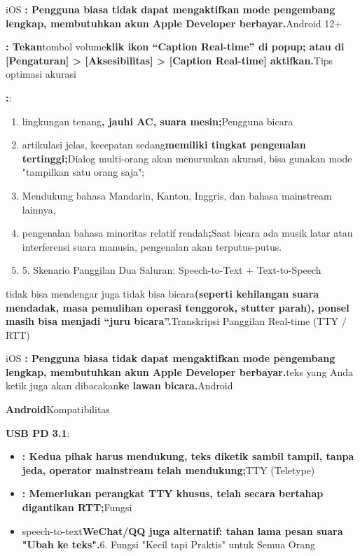 \begin{tcbinfo}{iOS}
\textbf{: Pengguna biasa tidak dapat mengaktifkan mode pengembang lengkap, membutuhkan akun Apple Developer berbayar.}Android 12+

\textbf{: Tekan}tombol volume\textbf{klik ikon “Caption Real-time” di popup; atau di [Pengaturan] > [Aksesibilitas] > [Caption Real-time] aktifkan.}Tips optimasi akurasi

\textbf{:}:

\begin{enumerate}
  \item lingkungan tenang\textbf{, jauhi AC, suara mesin;}Pengguna bicara
  \item artikulasi jelas, kecepatan sedang\textbf{memiliki tingkat pengenalan tertinggi;}Dialog multi-orang akan menurunkan akurasi, bisa gunakan mode "tampilkan satu orang saja";
  \item Mendukung bahasa Mandarin, Kanton, Inggris, dan bahasa mainstream lainnya,
  \item pengenalan bahasa minoritas relatif rendah\textbf{;}Saat bicara ada musik latar atau interferensi suara manusia, pengenalan akan terputus-putus.
  \item 5. Skenario Panggilan Dua Saluran: Speech-to-Text + Text-to-Speech
\end{enumerate}

\end{tcbinfo}


tidak bisa mendengar juga tidak bisa bicara\textbf{(seperti kehilangan suara mendadak, masa pemulihan operasi tenggorok, stutter parah), ponsel masih bisa menjadi “juru bicara”.}Transkripsi Panggilan Real-time (TTY / RTT)

\begin{tcbinfo}{iOS}
\textbf{: Pengguna biasa tidak dapat mengaktifkan mode pengembang lengkap, membutuhkan akun Apple Developer berbayar.}teks yang Anda ketik juga akan dibacakan\textbf{ke lawan bicara.}Android

\textbf{Android}Kompatibilitas

\textbf{USB PD 3.1}:

\begin{itemize}
  \item \textbf{: Kedua pihak harus mendukung, teks diketik sambil tampil, tanpa jeda, operator mainstream telah mendukung;}TTY (Teletype)
  \item \textbf{: Memerlukan perangkat TTY khusus, telah secara bertahap digantikan RTT;}Fungsi
  \item speech-to-text\textbf{WeChat/QQ juga alternatif: tahan lama pesan suara "Ubah ke teks".}6. Fungsi "Kecil tapi Praktis" untuk Semua Orang
\end{itemize}

\end{tcbinfo}

